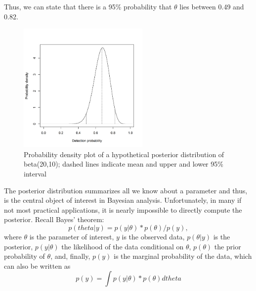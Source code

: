 Thus, we can state that there is a 95\% probability that $\theta$ lies
between 0.49 and 0.82.

\begin{figure}
\begin{center}
\includegraphics[height=2.5in]{Ch6/figs/densityvsdetection}
\end{center}
\caption{Probability density plot of a hypothetical posterior distribution of beta(20,10); dashed lines indicate mean and upper and lower 95\% interval}
\label{densityvsdetection.fig}
\end{figure}

The posterior distribution summarizes all we know about a parameter
and thus, is the central object of interest in Bayesian
analysis. Unfortunately, in many if not most practical applications,
it is nearly impossible to directly compute the posterior. Recall
Bayes’ theorem:
\begin{equation}
p(theta|y) = p(y|\theta) * p(\theta) / p(y),
\label{mcmc.eq.bayes}
\end{equation}
where $\theta$ is the parameter of interest, $y$ is the observed data,
$p(\theta|y)$ is the posterior, $p(y|\theta)$ the likelihood of the
data conditional on $\theta$, $p(\theta)$ the prior probability of
$\theta$, and, finally, $p(y)$ is the marginal probability of the
data, which can also be written as
\[
p(y) = \int p(y|\theta) * p(\theta) dtheta
\]

